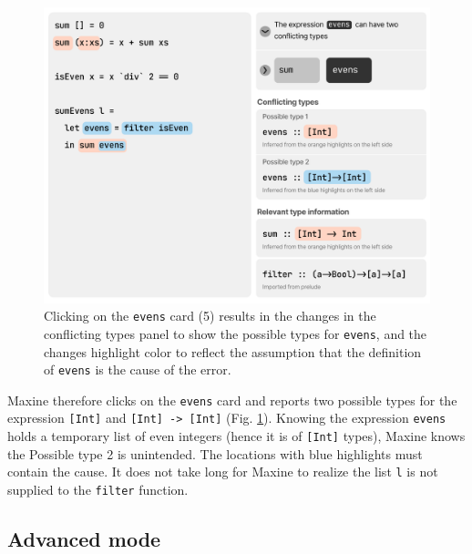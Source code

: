 \begin{figure}
   \centering
        \includegraphics[width=\linewidth,trim=0mm 8mm 0mm 0mm]{images/balanced-mode-2.pdf}
        \caption{
            Clicking on the \texttt{evens} card (5) results in the changes in the
            conflicting types panel to show the possible types for \texttt{evens},
            and the changes highlight color to reflect the assumption that the
            definition of \texttt{evens} is the cause of the error.  
        }
        \label{fig:balance-mode-2}
\end{figure}

Maxine therefore clicks on the \texttt{evens} card and \chameleon{} reports two
possible types for the expression \texttt{[Int]} and \texttt{[Int] -> [Int]}
(Fig. \ref{fig:balance-mode-2}). Knowing the expression \texttt{evens} holds
a temporary list of even integers (hence it is of \texttt{[Int]} types), Maxine
knows the Possible type 2 is unintended. The locations with blue highlights must
contain the cause. It does not take long for Maxine to realize the list 
\texttt{l} is not supplied to the \texttt{filter} function.


\subsection{Advanced mode}  \label{sub:advanced}



